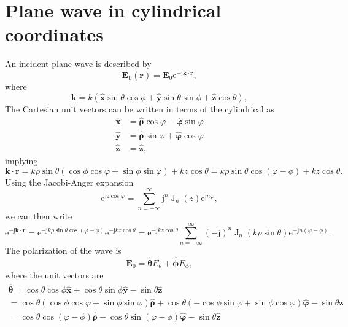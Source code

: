 \documentclass[a4paper,12pt]{article}
\renewcommand{\vec}[1]{\boldsymbol{#1}}
\newcommand{\unitvec}[1]{\hat{\vec{#1}}}
\newcommand{\mrm}[1]{\mathrm{#1}}
\newcommand{\ju}{\mrm{j}}
\newcommand{\eu}{\mrm{e}}
\newcommand{\Ev}{\vec{E}}
\newcommand{\rv}{\vec{r}}
\newcommand{\kv}{\vec{k}}
\newcommand{\xuv}{\unitvec{x}}
\newcommand{\yuv}{\unitvec{y}}
\newcommand{\zuv}{\unitvec{z}}
\newcommand{\rhouv}{\unitvec{\rho}}
\newcommand{\varphiuv}{\unitvec{\varphi}}
\newcommand{\thetauv}{\unitvec{\theta}}
\newcommand{\phiuv}{\unitvec{\phi}}
\newcommand{\BesselJ}{\operatorname{J}}
\begin{document}
\section{Plane wave in cylindrical coordinates}
\label{app:planewave}

An incident plane wave is described by
\begin{equation}
  \Ev_{\mrm{b}}(\rv) = \Ev_{0}\eu^{-\ju\kv\cdot\rv},
\end{equation}
where
\begin{equation}
  \kv = k(\xuv\sin\theta\cos\phi + \yuv\sin\theta\sin\phi + \zuv\cos\theta),
\end{equation}
The Cartesian unit vectors can be written in terms of the cylindrical as
\begin{align}
  \xuv &= \rhouv\cos\varphi - \varphiuv\sin\varphi \\
  \yuv &= \rhouv\sin\varphi + \varphiuv\cos\varphi \\
  \zuv &= \zuv,
\end{align}
implying
\begin{equation}
  \kv\cdot\rv = k\rho\sin\theta(\cos\phi\cos\varphi + \sin\phi\sin\varphi) + kz\cos\theta 
  = k\rho\sin\theta\cos(\varphi-\phi) + kz\cos\theta.
\end{equation}
Using the Jacobi-Anger expansion \cite[9.1.42--45]{Abramowitz+Stegun1970}
\begin{equation}
  \eu^{\ju z\cos\varphi} = \sum_{n=-\infty}^{\infty}\ju^{n}\BesselJ_{n}(z)\eu^{\ju n\varphi},
\end{equation}
we can then write
\begin{equation}
  \eu^{-\ju\kv\cdot\rv} = \eu^{-\ju k\rho\sin\theta\cos(\varphi-\phi)}\eu^{-\ju kz\cos\theta} = \eu^{-\ju kz\cos\theta} \sum_{n=-\infty}^{\infty}(-\ju)^{n}\BesselJ_{n}(k\rho\sin\theta)\eu^{-\ju n(\varphi-\phi)}.
\end{equation}
The polarization of the wave is
\begin{equation}
  \Ev_{0} = \thetauv E_{\theta} + \phiuv E_{\phi},
\end{equation}
where the unit vectors are
\begin{multline}
  \thetauv = \cos\theta\cos\phi\xuv + \cos\theta\sin\phi\yuv - \sin\theta\zuv \\
  = \cos\theta(\cos\phi\cos\varphi + \sin\phi\sin\varphi)\rhouv + \cos\theta(-\cos\phi\sin\varphi + \sin\phi\cos\varphi)\varphiuv - \sin\theta\zuv \\
  = \cos\theta\cos(\varphi-\phi)\rhouv - \cos\theta\sin(\varphi-\phi)\varphiuv - \sin\theta\zuv
\end{multline}
\end{document}
